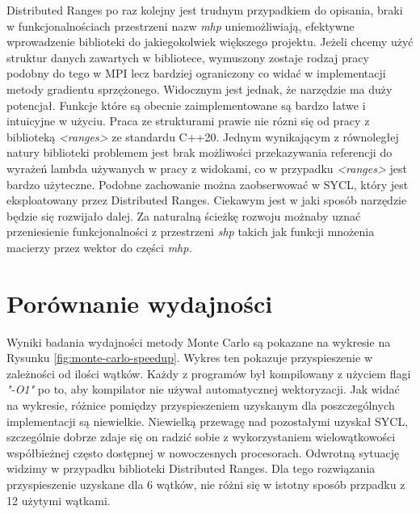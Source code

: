 \documentclass[a4paper,12pt]{book} %
\begin{document}
Distributed Ranges po raz kolejny jest trudnym przypadkiem do opisania, braki w funkcjonalnościach przestrzeni nazw \emph{mhp} uniemożliwiają, efektywne wprowadzenie biblioteki do jakiegokolwiek większego projektu. Jeżeli chcemy użyć struktur danych zawartych w bibliotece, wymuszony zostaje rodzaj pracy podobny do tego w MPI lecz bardziej ograniczony co widać w implementacji metody gradientu sprzężonego. Widocznym jest jednak, że narzędzie ma duży potencjał. Funkcje które są obecnie zaimplementowane są bardzo łatwe i intuicyjne w użyciu. Praca ze strukturami prawie nie rózni się od pracy z biblioteką \emph{<ranges>} ze standardu C++20. Jednym wynikającym z równoległej natury biblioteki problemem jest brak możliwości przekazywania referencji do wyrażeń lambda używanych w pracy z widokami, co w przypadku \emph{<ranges>} jest bardzo użyteczne. Podobne zachowanie można zaobserwować w SYCL, który jest eksploatowany przez Distributed Ranges. Ciekawym jest w jaki sposób narzędzie będzie się rozwijało dalej. Za naturalną ścieżkę rozwoju możnaby uznać przeniesienie funkcjonalności z przestrzeni \emph{shp} takich jak funkcji mnożenia macierzy przez wektor do części \emph{mhp.}

\chapter{Porównanie wydajności}
Wyniki badania wydajności metody Monte Carlo są pokazane na wykresie na Rysunku \ref{fig:monte-carlo-speedup}. Wykres ten pokazuje przyspieszenie w zależności od ilości wątków. Każdy z programów był kompilowany z użyciem flagi \emph{"-O1"} po to, aby kompilator nie używał automatycznej wektoryzacji. Jak widać na wykresie, różnice pomiędzy przyspieszeniem uzyskanym dla poszczególnych implementacji są niewielkie. Niewielką przewagę nad pozostałymi uzyskał SYCL, szczególnie dobrze zdaje się on radzić sobie z wykorzystaniem wielowątkowości współbieżnej często dostępnej w nowoczesnych procesorach. Odwrotną sytuację widzimy w przypadku biblioteki Distributed Ranges. Dla tego rozwiązania przyspieszenie uzyskane dla 6 wątków, nie różni się w istotny sposób przpadku z 12 użytymi wątkami.
\end{document}
